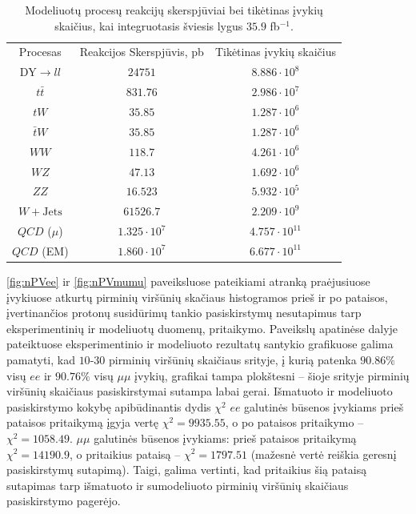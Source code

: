 \documentclass[a4paper, 12pt]{article}
\newcommand{\tbarW}{\bar{t}W}
\newcommand{\ttbar}{t\bar{t}}
\newcommand{\mumu}{\mu\mu}
\newcommand{\WJets}{W\! +\!\mathrm{Jets}}
\newcommand{\invfb}{fb$^{-1}$}
\newcommand{\QCD}{QC\! D}
\begin{document}
\begin{centering}
\begin{table}
\begin{tabular}{|c|c|c|}
	\hline 
	\multirow{3}{6em}{\centering Procesas} & \multirow{3}{7em}{\centering Reakcijos Skerspjūvis, pb} & \multirow{3}{7em}{\centering Tikėtinas įvykių skaičius} \\
	& & \\
	& & \\
	\hline \hline
	$\mathrm{DY}\rightarrow ll$ & $24751$ & $8.886 \cdot 10^8$ \\
	\hline
	$\ttbar$ & $831.76$ & $2.986 \cdot 10^7$ \\
	\hline
	$tW$ & $35.85$ & $1.287 \cdot 10^6$ \\
	\hline
	$\tbarW$ & $35.85$ & $1.287 \cdot 10^6$ \\
	\hline
	$WW$ & $118.7$ & $4.261 \cdot 10^6$ \\
	\hline
	$WZ$ & $47.13$ & $1.692 \cdot 10^6$ \\
	\hline
	$ZZ$ & $16.523$ & $5.932 \cdot 10^5$ \\
	\hline
	$\WJets$ & $61526.7$ & $2.209 \cdot 10^9$ \\
	\hline
	$\QCD$ ($\mu$) & $1.325 \cdot 10^7$ & $4.757 \cdot 10^{11}$ \\
	\hline
	$\QCD$ (EM) & $1.860 \cdot 10^7$ & $6.677 \cdot 10^{11}$ \\
	\hline
\end{tabular}
\caption{\label{table:Xsec} Modeliuotų procesų reakcijų skerspjūviai bei tikėtinas įvykių skaičius, kai integruotasis
	šviesis lygus $35.9$ \invfb.}
\end{table}
\end{centering}

\ref{fig:nPVee} ir \ref{fig:nPVmumu} paveiksluose pateikiami atranką praėjusiuose įvykiuose atkurtų pirminių viršūnių
skačiaus histogramos prieš ir po pataisos, įvertinančios protonų susidūrimų tankio pasiskirstymų nesutapimus tarp
eksperimentinių ir modeliuotų duomenų, pritaikymo.
Paveikslų apatinėse dalyje pateiktuose eksperimentinio ir modeliuoto rezultatų santykio grafikuose galima pamatyti, kad
$10$-$30$ pirminių viršūnių skaičiaus srityje, į kurią patenka $90.86\%$ visų $ee$ ir $90.76\%$ visų $\mumu$ įvykių,
grafikai tampa plokštesni -- šioje srityje pirminių viršūnių skaičiaus pasiskirstymai sutampa labai gerai.
Išmatuoto ir modeliuoto pasiskirstymo kokybę apibūdinantis dydis $\chi^2$ $ee$ galutinės būsenos įvykiams prieš pataisos
pritaikymą įgyja vertę $\chi^2 = 9935.55$, o po pataisos pritaikymo -- $\chi^2 = 1058.49$.
$\mumu$ galutinės būsenos įvykiams: prieš pataisos pritaikymą $\chi^2 = 14190.9$, o pritaikius pataisą -- $\chi^2 = 1797.51$
(mažesnė vertė reiškia geresnį pasiskirstymų sutapimą).
Taigi, galima vertinti, kad pritaikius šią pataisą sutapimas tarp išmatuoto ir sumodeliuoto pirminių viršūnių skaičiaus
pasiskirstymo pagerėjo.
\end{document}
